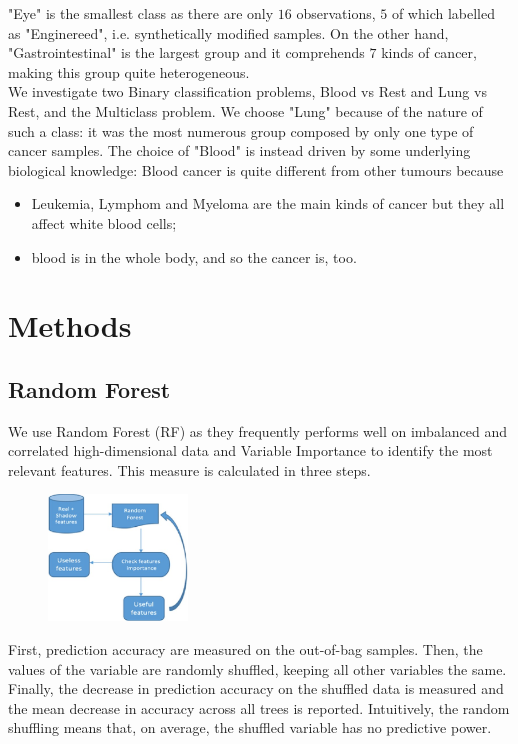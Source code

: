 \documentclass[a4paper,11pt, oneside]{article}  %
\begin{document}
"Eye" is the smallest class as there are only $16$ observations, $5$ of which labelled as "Enginereed", i.e.  synthetically modified samples. On the other hand, "Gastrointestinal" is the largest group and it comprehends $7$ kinds of cancer,  making this group quite heterogeneous. \\
We investigate two Binary classification problems,  Blood vs Rest and Lung vs Rest, and the Multiclass problem. We choose "Lung" because of the nature of such a class: it was the most numerous group composed by only one type of cancer samples. The choice of "Blood" is instead driven by some underlying biological knowledge: Blood cancer is quite different from other tumours because
\begin{itemize}
	\item Leukemia, Lymphom and Myeloma are the main kinds of cancer but they all affect white blood cells;
	\item blood is in the whole body, and so the cancer is, too.
\end{itemize} 

\section{Methods}
\subsection{Random Forest}
We use Random Forest (RF) as they frequently performs well on imbalanced and correlated high-dimensional data and Variable Importance to identify the most relevant features.  This measure is calculated in three steps. 

\begin{figure}
	\includegraphics[width=0.33\textwidth]{Boruta-Algorithm.jpg}
	\label{fig2}
\end{figure}
First, prediction accuracy are measured on the out-of-bag samples. Then, the values of the variable are randomly shuffled, keeping all other variables the same.  Finally, the decrease in prediction accuracy on the shuffled data is measured and the mean decrease in accuracy across all trees is reported.  Intuitively, the random shuffling means that, on average, the shuffled variable has no predictive power. 
\end{document}
